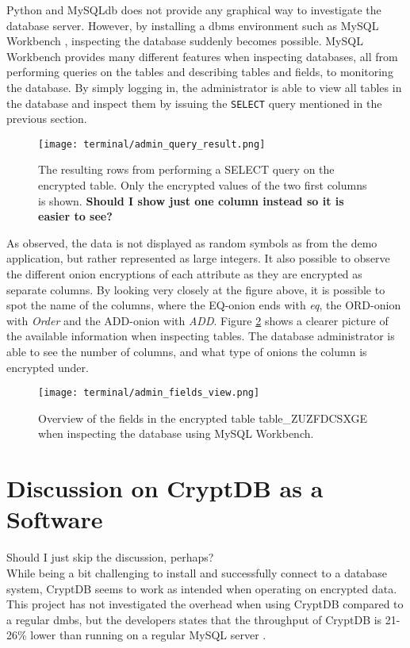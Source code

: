Python and MySQLdb does not provide any graphical way to investigate the database server. However, by installing a \gls{dbms} environment such as MySQL Workbench \cite{mysql_workbench}, inspecting the database suddenly becomes possible. MySQL Workbench provides many different features when inspecting databases, all from performing queries on the tables and describing tables and fields, to 
monitoring the database. By simply logging in, the administrator is able to view all tables in the database and inspect them by issuing the \verb!SELECT! query mentioned in the previous section.

\begin{figure}[h]
	\centering
	\texttt{[image: terminal/admin\_query\_result.png]}
	\caption{The resulting rows from performing a SELECT query on the encrypted table. Only the encrypted values of the two first columns is shown. \textbf{Should I show just one column instead so it is easier to see?}}
	\label{fig:admin_query_result}
\end{figure}

As observed, the data is not displayed as random symbols as from the demo application, but rather represented as large integers. It also possible to observe the different onion encryptions of each attribute as they are encrypted as separate columns. By looking very closely at the figure above, it is possible to spot the name of the columns, where the EQ-onion ends with \emph{eq}, the ORD-onion with \emph{Order} and the ADD-onion with \emph{ADD}. Figure \ref{fig:admin_fields_view} shows a clearer picture of the available information when inspecting tables. The database administrator is able to see the number of columns, and what type of onions the column is encrypted under.

\begin{figure}[h]
	\centering
	\texttt{[image: terminal/admin\_fields\_view.png]}
	\caption{Overview of the fields in the encrypted table table\_ZUZFDCSXGE when inspecting the database using MySQL Workbench.}
	\label{fig:admin_fields_view}
\end{figure}

\section{Discussion on CryptDB as a Software}

Should I just skip the discussion, perhaps? \\

While being a bit challenging to install and successfully connect to a database system, CryptDB seems to work as intended when operating on encrypted data. This project has not investigated the overhead when using CryptDB compared to a regular \gls{dmbs}, but the developers states that the throughput of CryptDB is 21-26\% lower than running on a regular MySQL server \citep{CryptDB_Main_Paper}. 

